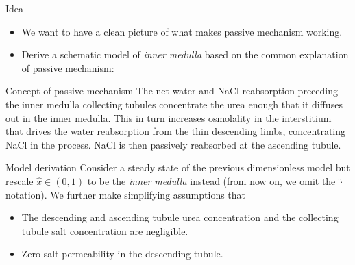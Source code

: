 \documentclass{beamer}
\begin{document}
\begin{frame}{Idea}
    \begin{itemize}
        \item We want to have a clean picture of what makes passive mechanism working.
        \item Derive a schematic model of \textit{inner medulla} based on the common explanation of passive mechanism:
    \end{itemize}
    \begin{alertblock}{Concept of passive mechanism}
        The net water and NaCl reabsorption preceding the inner medulla collecting tubules concentrate the urea enough that it diffuses out in the inner medulla.
        This in turn increases osmolality in the interstitium that drives the water reabsorption from the thin descending limbs, concentrating NaCl in the process.
        NaCl is then passively reabsorbed at the ascending tubule.
    \end{alertblock}
    
\end{frame}

\begin{frame}{Model derivation}
    Consider a steady state of the previous dimensionless model but rescale $\hat{x}\in (0,1)$ to be the \textit{inner medulla} instead (from now on, we omit the $\hat{\cdot}$ notation).
    We further make simplifying assumptions that 
    \begin{itemize}
        \item The descending and ascending tubule urea concentration and the collecting tubule salt concentration are negligible.
        \item Zero salt permeability in the descending tubule.
    \end{itemize}

    
\end{frame}
\end{document}
